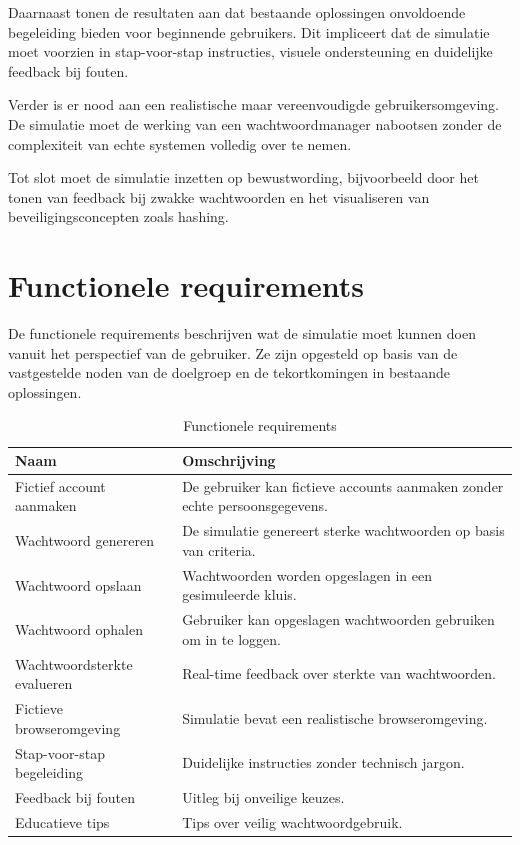 Daarnaast tonen de resultaten aan dat bestaande oplossingen onvoldoende begeleiding bieden voor beginnende gebruikers. Dit impliceert dat de simulatie moet voorzien in stap-voor-stap instructies, visuele ondersteuning en duidelijke feedback bij fouten.

Verder is er nood aan een realistische maar vereenvoudigde gebruikersomgeving. De simulatie moet de werking van een wachtwoordmanager nabootsen zonder de complexiteit van echte systemen volledig over te nemen.

Tot slot moet de simulatie inzetten op bewustwording, bijvoorbeeld door het tonen van feedback bij zwakke wachtwoorden en het visualiseren van beveiligingsconcepten zoals hashing.

\section{Functionele requirements}
De functionele requirements beschrijven wat de simulatie moet kunnen doen vanuit het perspectief van de gebruiker. Ze zijn opgesteld op basis van de vastgestelde noden van de doelgroep en de tekortkomingen in bestaande oplossingen.

\begin{table}[H]
\centering
\begin{tabularx}{\textwidth}{l X}
\toprule
\textbf{Naam} & \textbf{Omschrijving} \\
\midrule

Fictief account aanmaken & De gebruiker kan fictieve accounts aanmaken zonder echte persoonsgegevens. \\

Wachtwoord genereren & De simulatie genereert sterke wachtwoorden op basis van criteria. \\

Wachtwoord opslaan & Wachtwoorden worden opgeslagen in een gesimuleerde kluis. \\

Wachtwoord ophalen & Gebruiker kan opgeslagen wachtwoorden gebruiken om in te loggen. \\

Wachtwoordsterkte evalueren & Real-time feedback over sterkte van wachtwoorden. \\

Fictieve browseromgeving & Simulatie bevat een realistische browseromgeving. \\

Stap-voor-stap begeleiding & Duidelijke instructies zonder technisch jargon. \\

Feedback bij fouten & Uitleg bij onveilige keuzes. \\

Educatieve tips & Tips over veilig wachtwoordgebruik. \\

\bottomrule
\end{tabularx}
\caption{Functionele requirements}
\end{table}

